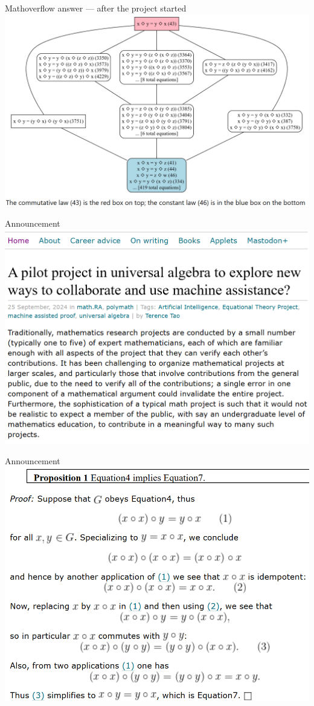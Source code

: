\documentclass{beamer}
\begin{document}
\begin{frame}{Mathoverflow answer --- after the project started}
\includegraphics[width=\textwidth]{mathoverflow_tao}
\end{frame}


\begin{frame}{Announcement}
\includegraphics[width=\textwidth]{initial_announcement}
\end{frame}


\begin{frame}{Announcement}
\includegraphics[width=\textwidth]{initial_implication}
\end{frame}
\end{document}
